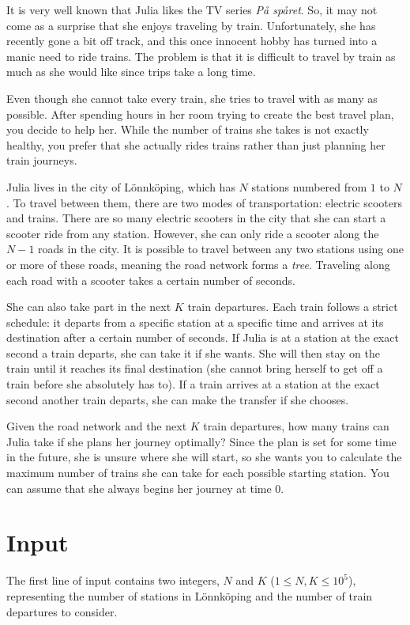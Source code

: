 It is very well known that Julia likes the TV series \textit{På spåret}. So, it may not come as
a surprise that she enjoys traveling by train. Unfortunately, she has recently gone a bit off
track, and this once innocent hobby has turned into a manic need to ride trains. The problem is
that it is difficult to travel by train as much as she would like since trips take a long time.  

Even though she cannot take every train, she tries to travel with as many as possible. After
spending hours in her room trying to create the best travel plan, you decide to help her.
While the number of trains she takes is not exactly healthy, you prefer that she actually
rides trains rather than just planning her train journeys.  

Julia lives in the city of Lönnköping, which has $N$ stations numbered from $1$ to $N$.
To travel between them, there are two modes of transportation: electric scooters and trains.
There are so many electric scooters in the city that she can start a scooter ride from any station.
However, she can only ride a scooter along the $N-1$ roads in the city. It is possible to travel
between any two stations using one or more of these roads, meaning the road network forms a \textit{tree}.
Traveling along each road with a scooter takes a certain number of seconds.  

She can also take part in the next $K$ train departures. Each train follows a strict schedule: it
departs from a specific station at a specific time and arrives at its destination after a certain number
of seconds. If Julia is at a station at the exact second a train departs, she can take it if she wants.
She will then stay on the train until it reaches its final destination (she cannot bring herself to
get off a train before she absolutely has to). If a train arrives at a station at the exact second
another train departs, she can make the transfer if she chooses.  

Given the road network and the next $K$ train departures, how many trains can Julia take if she plans
her journey optimally? Since the plan is set for some time in the future, she is unsure where she
will start, so she wants you to calculate the maximum number of trains she can take for each possible
starting station. You can assume that she always begins her journey at time $0$.  


\section*{Input}
The first line of input contains two integers, $N$ and $K$ ($1 \leq N, K \leq 10^5$), representing
the number of stations in Lönnköping and the number of train departures to consider.

